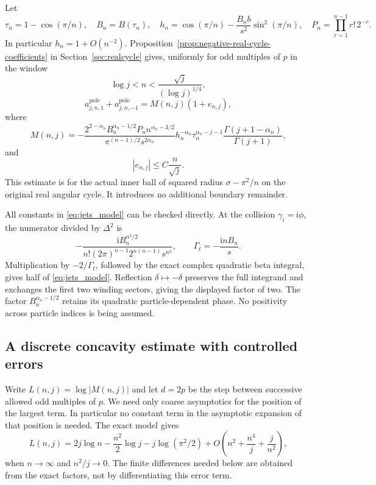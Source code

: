 \documentclass[11pt]{article}
\numberwithin{equation}{section}
\theoremstyle{definition}
\newcommand{\ii}{\mathrm i}
\begin{document}
Let
\begin{equation}\label{eq:jets_model_parameters}
 \tau_n=1-\cos(\pi/n),\quad B_n=B(\tau_n),\quad
 h_n=\cos(\pi/n)-\frac{B_n b}{s^2}\sin^2(\pi/n),\quad
 P_n=\prod_{r=1}^{n-1}r!\,2^{-r}.
\end{equation}
In particular $h_n=1+O(n^{-2})$. Proposition~\ref{prop:negative-real-cycle-coefficients} in
Section~\ref{sec:realcycle} gives, uniformly for odd multiples of $p$
in the window
\[
 \log j<n<\frac{\sqrt j}{(\log j)^{1/4}},
\]
\begin{equation}\label{eq:jets_uniform_model}
 a_{j,n,1}^{\mathrm{pole}}+a_{j,n,-1}^{\mathrm{pole}}
 =M(n,j)(1+e_{n,j}),
\end{equation}
where
\begin{equation}\label{eq:jets_model}
 M(n,j)=-\frac{2^{2-\alpha_n}B_n^{\alpha_n-1/2}P_n
                     n^{\alpha_n-3/2}}
                   {\pi^{(n-1)/2}s^{2\alpha_n}}
 h_n^{-\alpha_n}\tau_n^{\alpha_n-j-1}
 \frac{\Gamma(j+1-\alpha_n)}{\Gamma(j+1)},
\end{equation}
and
\begin{equation}\label{eq:jets_model_errors}
 |e_{n,j}|\le C\frac n{\sqrt j}.
\end{equation}
This estimate is for the actual inner ball of squared radius
$\sigma-\pi^2/n$ on the original real angular cycle. It introduces
no additional boundary remainder.

All constants in \eqref{eq:jets_model} can be checked directly.
At the collision $\gamma_i=\ii\phi$, the numerator divided by
$\Delta^2$ is
\[
 -\frac{\ii B_n^{n^2/2}}
       {n!(2\pi)^{n-1}2^{n(n-1)}s^{n^2}},
 \qquad \Gamma_t=-\frac{\ii nB_n}s.
\]
Multiplication by $-2/\Gamma_t$, followed by the exact complex quadratic beta integral, gives half of \eqref{eq:jets_model}.
Reflection $\delta\mapsto-\delta$ preserves the full integrand and
exchanges the first two winding sectors, giving the displayed
factor of two. The factor $B_n^{\alpha_n-1/2}$ retains its quadratic
particle-dependent phase. No positivity across particle indices is
being assumed.

\subsection{A discrete concavity estimate with controlled errors}

Write $L(n,j)=\log|M(n,j)|$ and let $d=2p$ be the step between
successive allowed odd multiples of $p$.  We need only coarse
asymptotics for the position of the largest term.  In particular no
constant term in the asymptotic expansion of that position is needed.
The exact model gives
\begin{equation}\label{eq:jets_L_expansion}
 L(n,j)=2j\log n-\frac{n^2}{2}\log j-j\log(\pi^2/2)
       +O\left(n^2+\frac{n^4}{j}+\frac{j}{n^2}\right),
\end{equation}
when $n\to\infty$ and $n^2/j\to0$.  The finite differences needed
below are obtained from the exact factors, not by differentiating this
error term.
\end{document}
